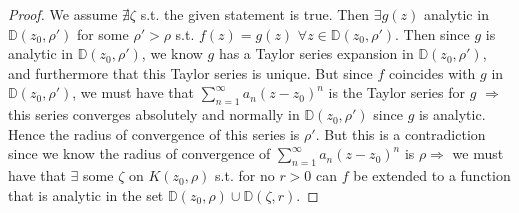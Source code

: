 \documentclass[10pt]{article}
\begin{document}
\begin{proof} 
We assume $\nexists \zeta$ s.t. the given statement is true. Then $\exists g(z)$ analytic in $\mathbb{D}(z_0,\rho')$ for some $\rho' > \rho$ s.t. $f(z) = g(z)$ $\forall z \in \mathbb{D}(z_0,\rho')$. Then since $g$ is analytic in $\mathbb{D}(z_0,\rho')$, we know $g$ has a Taylor series expansion in $\mathbb{D}(z_0,\rho')$, and furthermore that this Taylor series is unique. But since $f$ coincides with $g$ in $\mathbb{D}(z_0,\rho')$, we must have that $\sum_{n = 1}^\infty a_n(z- z_0)^n$ is the Taylor series for $g$ $\Rightarrow$ this series converges absolutely and normally in $\mathbb{D}(z_0,\rho')$ since $g$ is analytic. Hence the radius of convergence of this series is $\rho'$. But this is a contradiction since we know the radius of convergence of $\sum_{n = 1}^\infty a_n(z- z_0)^n$ is $\rho \Rightarrow$ we must have that $\exists$ some $\zeta$ on $K(z_0,\rho)$ s.t. for no $r > 0$ can $f$ be extended to a function that is analytic in the set $\mathbb{D}(z_0,\rho) \cup \mathbb{D}(\zeta,r)$. 
\end{proof}
\end{document}
